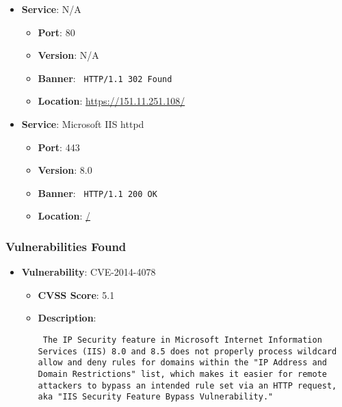 \documentclass{article}
\begin{document}
\begin{itemize}
    
        \item \textbf{Service}: N/A
        \begin{itemize}
            \item \textbf{Port}: 80
            \item \textbf{Version}:  N/A 
            \item \textbf{Banner}: \texttt{ HTTP/1.1 302 Found
 }
            \item \textbf{Location}: \href{ https://151.11.251.108/ }{ https://151.11.251.108/ }
        \end{itemize}
    
        \item \textbf{Service}: Microsoft IIS httpd
        \begin{itemize}
            \item \textbf{Port}: 443
            \item \textbf{Version}:  8.0 
            \item \textbf{Banner}: \texttt{ HTTP/1.1 200 OK
 }
            \item \textbf{Location}: \href{ / }{ / }
        \end{itemize}
    
\end{itemize}


\subsubsection*{Vulnerabilities Found}

\begin{itemize}
    
        \item \textbf{Vulnerability}: CVE-2014-4078
        \begin{itemize}
            \item \textbf{CVSS Score}:  5.1 
            \item \textbf{Description}: \parbox{\linewidth}{\texttt{ The IP Security feature in Microsoft Internet Information Services (IIS) 8.0 and 8.5 does not properly process wildcard allow and deny rules for domains within the "IP Address and Domain Restrictions" list, which makes it easier for remote attackers to bypass an intended rule set via an HTTP request, aka "IIS Security Feature Bypass Vulnerability." }}
        \end{itemize}
    
\end{itemize}
\end{document}
